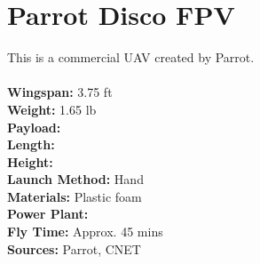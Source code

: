\documentclass{article}
\begin{document}
\section{Parrot Disco FPV}
This is a commercial UAV created by Parrot.\\\\
\textbf{Wingspan:} 3.75 ft\\
\textbf{Weight:} 1.65 lb\\
\textbf{Payload:} \\
\textbf{Length:}  \\
\textbf{Height:}\\
\textbf{Launch Method:} Hand\\
\textbf{Materials:} Plastic foam \\
\textbf{Power Plant:} \\
\textbf{Fly Time:} Approx. 45 mins\\

\textbf{Sources:} Parrot, CNET
\end{document}
